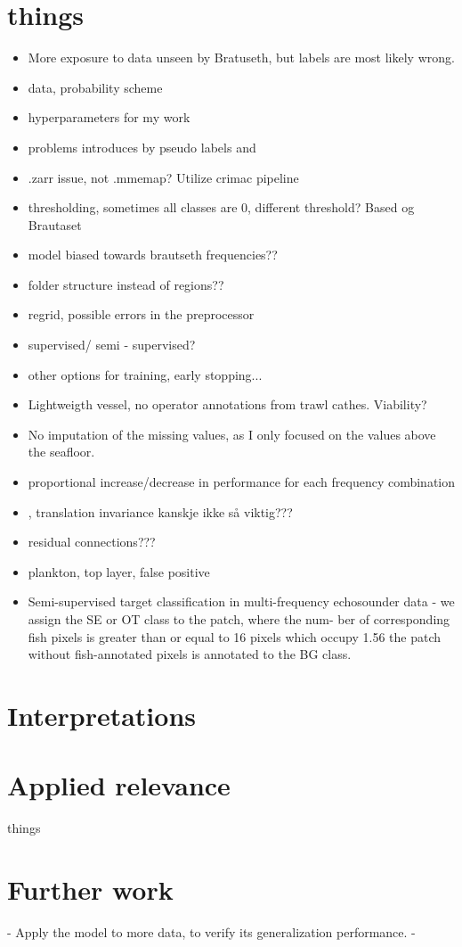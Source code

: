    
    




    \section{things}
        \begin{itemize}
            \item More exposure to data unseen by Bratuseth, but labels are most likely wrong. 
            \item data, probability scheme
            \item hyperparameters for my work
            \item problems introduces by pseudo labels and 
            \item .zarr issue, not .mmemap? Utilize crimac pipeline
            \item thresholding, sometimes all classes are 0, different threshold? Based og Brautaset
            \item model biased towards brautseth frequencies??
            \item folder structure instead of regions??
            \item regrid, possible errors in the preprocessor 
            \item supervised/ semi - supervised? 
            \item other options for training, early stopping...
            \item Lightweigth vessel, no operator annotations from trawl cathes. Viability?
            \item No imputation of the missing values, as I only focused on the values above the seafloor.
            \item proportional increase/decrease in performance for each frequency combination \item \citet{mohammed2006acoustic}, translation invariance kanskje ikke så viktig???
            \item residual connections??? \cite{zhang2018road}
            \item plankton, top layer, false positive
            \item Semi-supervised target classification in multi-frequency
echosounder data - we assign the SE or OT class to the patch, where the num-
ber of corresponding fish pixels is greater than or equal to 16 pixels
which occupy 1.56%
the patch without fish-annotated pixels is annotated to the BG class.
        \end{itemize}

    \section{Interpretations}
    \section{Applied relevance}
        things
    
    
    \section{Further work}
        - Apply the model to more data, to verify its generalization performance.
        - 